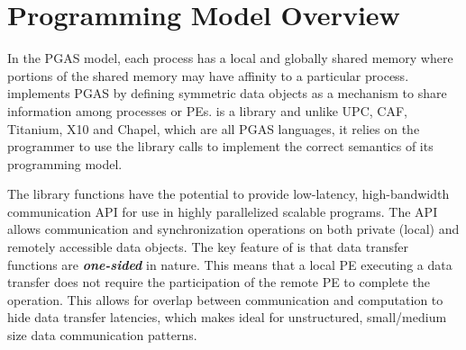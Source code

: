 \section{Programming Model Overview}
In the \ac{PGAS} model, each process has a local and globally shared memory where portions of the shared memory may have affinity to a particular process. \openshmem implements \ac{PGAS} by defining symmetric data objects as a mechanism to share information among \openshmem processes or \acp{PE}. \openshmem is a library and unlike UPC, CAF, Titanium, X10 and Chapel, which are all PGAS languages, it relies on the programmer to use the library calls  to implement the correct semantics of its programming model.

The \openshmem library functions have the potential to provide low-latency, high-bandwidth communication \ac{API} for use in highly parallelized scalable programs. The \ac{API} allows communication and synchronization operations on both private (local) and remotely accessible data objects. The key feature of \openshmem is that data transfer functions are \textit{\textbf{one-sided}} in nature. This means that a local \ac{PE} executing a data transfer does not require the participation of the remote \ac{PE} to complete the operation. This allows for overlap between communication and computation to hide data transfer latencies, which makes  \openshmem ideal for unstructured, small/medium size data communication patterns.


